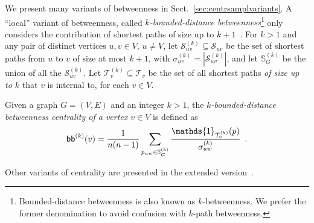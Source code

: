 \ifproof
We present many variants of betweenness in Sect.~\ref{sec:centrsamplvariants}.
\else
A ``local'' variant of betweenness, called \emph{$k$-bounded-distance
betweenness}\footnote{Bounded-distance betweenness is also known as
$k$-betweenness. We prefer the former denomination to avoid confusion with
$k$-path betweenness.} only considers
the contribution of shortest paths of size up to $k+1$~\citep{BorgattiE06,Brandes08}.
For $k>1$ and any pair of distinct vertices $u,v\in V$, $u\neq V$, let
$\mathcal{S}^{(k)}_{uv}\subseteq\mathcal{S}_{uv}$ be the set of shortest paths
from $u$ to $v$ of size at most $k+1$, with
$\sigma^{(k)}_{uv}=|\mathcal{S}^{(k)}_{uv}|$, and let $\mathbb{S}^{(k)}_G$ be the
union of all the $\mathcal{S}^{(k)}_{uv}$. Let
$\mathcal{T}^{(k)}_v\subseteq\mathcal{T}_v$ be the set of all shortest paths
\emph{of size up to $k$} that $v$ is internal to, for each $v\in V$.

\begin{definition}\label{def:centrsamplkboundbetweenness}
  \citep{BorgattiE06,Brandes08} Given a graph $G=(V,E)$ and an integer $k>1$,
  the \emph{$k$-bounded-distance betweenness centrality of a vertex $v\in V$} is
  defined as
  \[
  \kboundbetw^{(k)}(v)=\frac{1}{n(n-1)}\sum_{p_{uw}\in\mathbb{S}^{(k)}_G}\frac{\mathds{1}_{\mathcal{T}^{(k)}_v}(p)}{\sigma^{(k)}_{uw}}
  \enspace.
  \]
\end{definition}
Other variants of centrality are presented in the extended
version~\citep{RiondatoK13}.
\fi

